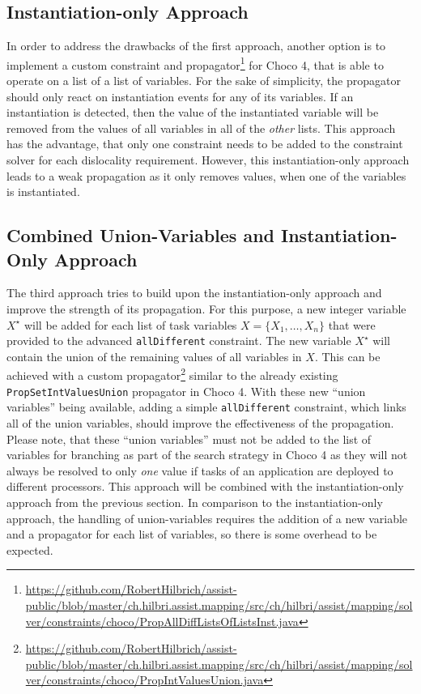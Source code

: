 \documentclass[english,biblatex]{lni}
\begin{document}
\subsection*{Instantiation-only Approach}

In order to address the drawbacks of the first approach, another option is to implement a custom constraint and propagator\footnote{\url{https://github.com/RobertHilbrich/assist-public/blob/master/ch.hilbri.assist.mapping/src/ch/hilbri/assist/mapping/solver/constraints/choco/PropAllDiffListsOfListsInst.java}} for Choco 4, that is able to operate on a list of a list of variables.
For the sake of simplicity, the propagator should only react on instantiation events for any of its variables.
If an instantiation is detected, then the value of the instantiated variable will be removed from the values of all variables in all of the \emph{other} lists.
This approach has the advantage, that only one constraint needs to be added to the constraint solver for each dislocality requirement.
However, this instantiation-only approach leads to a weak propagation as it only removes values, when one of the variables is instantiated.

\subsection*{Combined Union-Variables and Instantiation-Only Approach}

The third approach tries to build upon the instantiation-only approach and improve the strength of its propagation.
For this purpose, a new integer variable $X^\star$ will be added for each list of task variables $X = \{X_1, \dots, X_n\}$ that were provided to the advanced \texttt{allDifferent} constraint.
The new variable $X^\star$ will contain the union of the remaining values of all variables in $X$.
This can be achieved with a custom propagator\footnote{\url{https://github.com/RobertHilbrich/assist-public/blob/master/ch.hilbri.assist.mapping/src/ch/hilbri/assist/mapping/solver/constraints/choco/PropIntValuesUnion.java}} similar to the already existing \texttt{PropSetIntValuesUnion} propagator in Choco 4.
With these new ``union variables'' being available, adding a simple \texttt{allDifferent} constraint, which links all of the union variables, should improve the effectiveness of the propagation.
Please note, that these ``union variables'' must not be added to the list of variables for branching as part of the search strategy in Choco 4 as they will not always be resolved to only \emph{one} value if tasks of an application are deployed to different processors.
This approach will be combined with the instantiation-only approach from the previous section.
In comparison to the instantiation-only approach, the handling of union-variables requires the addition of a new variable and a propagator for each list of variables, so there is some overhead to be expected.
\end{document}
